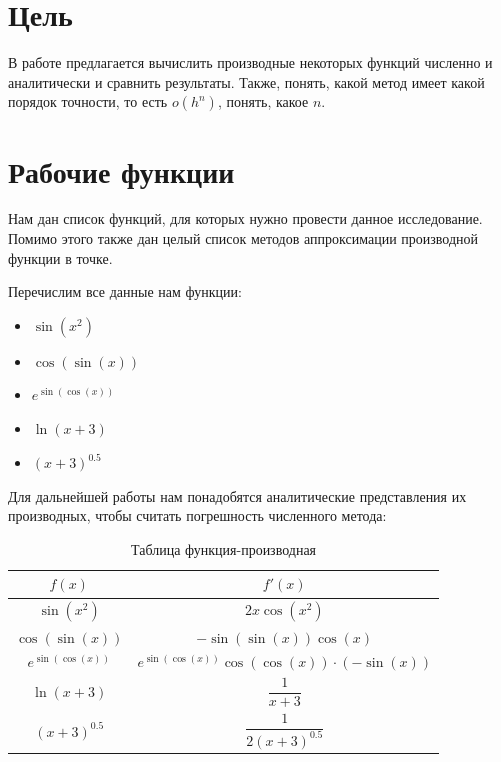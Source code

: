 
\setlength\extrarowheight{13pt}
\setcounter{secnumdepth}{0}


		
		\tableofcontents
		\newpage
		
		\section*{Цель}
		В работе предлагается вычислить производные некоторых функций численно и аналитически и сравнить результаты. Также, понять, какой метод имеет какой порядок точности, то есть $o(h^n)$, понять, какое $n$.
		
		
		\section*{Рабочие функции}
		Нам дан список функций, для которых нужно провести данное исследование. Помимо этого также дан целый список методов аппроксимации производной функции в точке.  
		
		Перечислим все данные нам функции:
		\begin{itemize}
			\item $\sin(x^2)$
			\item $\cos(\sin(x))$
			\item $e^{\sin(\cos(x))}$
			\item $\ln(x + 3)$
			\item $(x + 3)^{0.5}$ 
		\end{itemize}
		
		Для дальнейшей работы нам понадобятся аналитические представления их производных, чтобы считать погрешность численного метода:
		\begin{table}[h!]
			\centering
			\begin{tabular}{|c|c|}
				\hline
				$f(x)$              & $f'(x)$                                         \\ \hline
				$\sin(x^2)$         & $2x\cos(x^2)$                                   \\ \hline
				$\cos(\sin(x))$     & $-\sin(\sin(x))\cos(x)$                         \\ \hline
				$e^{\sin(\cos(x))}$ & $e^{\sin(\cos(x))}\cos(\cos(x))\cdot(-\sin(x))$ \\ \hline
				$\ln(x + 3)$        & $\dfrac{1}{x+3}$                                \\ \hline
				$(x + 3)^{0.5}$     & $\dfrac{1}{2(x+3)^{0.5}}$                       \\ \hline
			\end{tabular}
			\caption{Таблица функция-производная}
		\end{table}
		
